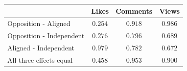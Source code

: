 \begingroup\centering\scriptsize
\setlength{\tabcolsep}{5pt}
\begin{tabular}{@{}lccc@{}}\toprule
 & Likes & Comments & Views \\
\midrule
Opposition - Aligned & $0.254$ & $0.918$ & $0.986$ \\
Opposition - Independent & $0.276$ & $0.796$ & $0.689$ \\
Aligned - Independent & $0.979$ & $0.782$ & $0.672$ \\
All three effects equal & $0.458$ & $0.953$ & $0.900$ \\
\bottomrule\end{tabular}\par\endgroup
